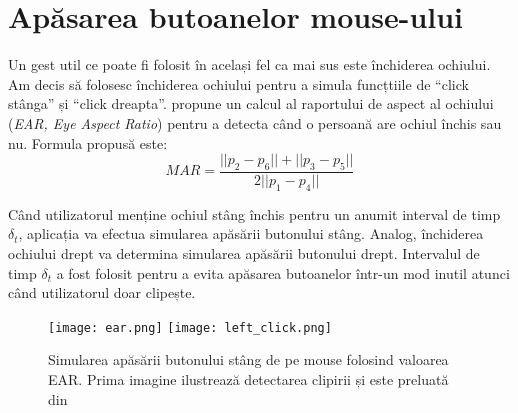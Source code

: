 \section{Apăsarea butoanelor mouse-ului}
Un gest util ce poate fi folosit în același fel ca mai sus este închiderea ochiului.
Am decis să folosesc închiderea ochiului pentru a simula funcțtiile de ``click stânga'' și ``click dreapta''.
\cite{blink_detection} propune un calcul al raportului de aspect al ochiului (\emph{EAR, Eye Aspect Ratio}) pentru a detecta când o persoană are ochiul închis sau nu.
Formula propusă este:
$$MAR = \frac{||p_2 - p_6|| + ||p_3 - p_5||}{2||p_1 - p_4||}$$


Când utilizatorul menține ochiul stâng închis pentru un anumit interval de timp $\delta_t$, aplicația va efectua simularea apăsării butonului stâng.
Analog, închiderea ochiului drept va determina simularea apăsării butonului drept.
Intervalul de timp $\delta_t$ a fost folosit pentru a evita apăsarea butoanelor într-un mod inutil atunci când utilizatorul doar clipește.

\begin{figure}[H]
    \centering
    \texttt{[image: ear.png]}
    \texttt{[image: left\_click.png]}
    \caption{Simularea apăsării butonului stâng de pe mouse folosind valoarea EAR. Prima imagine ilustrează detectarea clipirii și este preluată din \cite{blink_detection}}
\end{figure}